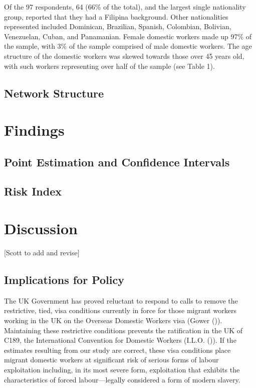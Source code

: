 \documentclass[
  12pt,
]{article}
\theoremstyle{plain}
\theoremstyle{definition}
\begin{document}
Of the 97 respondents, 64 (66\% of the total), and the largest single
nationality group, reported that they had a Filipina background. Other
nationalities represented included Dominican, Brazilian, Spanish,
Colombian, Bolivian, Venezuelan, Cuban, and Panamanian. Female domestic
workers made up 97\% of the sample, with 3\% of the sample comprised of
male domestic workers. The age structure of the domestic workers was
skewed towards those over 45 years old, with such workers representing
over half of the sample (see Table 1).

\subsection{Network Structure}\label{network-structure}

\section{Findings}\label{findings}

\subsection{Point Estimation and Confidence
Intervals}\label{point-estimation-and-confidence-intervals}

\subsection{Risk Index}\label{risk-index}

\section{Discussion}\label{discussion}

{[}Scott to add and revise{]}

\subsection{Implications for Policy}\label{implications-for-policy}

The UK Government has proved reluctant to respond to calls to remove the
restrictive, tied, visa conditions currently in force for those migrant
workers working in the UK on the Overseas Domestic Workers visa (Gower
()). Maintaining these restrictive
conditions prevents the ratification in the UK of C189, the
International Convention for Domestic Workers (I.L.O.
()). If the estimates resulting
from our study are correct, these visa conditions place migrant domestic
workers at significant risk of serious forms of labour exploitation
including, in its most severe form, exploitation that exhibits the
characteristics of forced labour---legally considered a form of modern
slavery.
\end{document}
